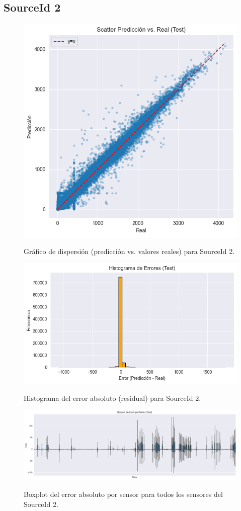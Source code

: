 \subsection*{SourceId 2}

\begin{figure}[H]
	\centering
	\caption{Gráfico de dispersión (predicción vs. valores reales) para SourceId 2.}
	\includegraphics[width=0.75\linewidth]{includes/cap5/graphs/advanced/sid2_scatter_predicted_vs_actual.png}
	\label{fig:sid2_scatter}
\end{figure}

\begin{figure}[H]
	\centering
	\caption{Histograma del error absoluto (residual) para SourceId 2.}
	\includegraphics[width=0.75\linewidth]{includes/cap5/graphs/advanced/sid2_error_histogram_predicted_vs_actual.png}
	\label{fig:sid2_histograma_error}
\end{figure}

\begin{figure}[H]
	\centering
	\caption{Boxplot del error absoluto por sensor para todos los sensores del SourceId 2.}
	\includegraphics[width=0.75\linewidth]{includes/cap5/graphs/advanced/sid2_all_meters_error_boxplot.png}
	\label{fig:sid2_boxplot_all}
\end{figure}

